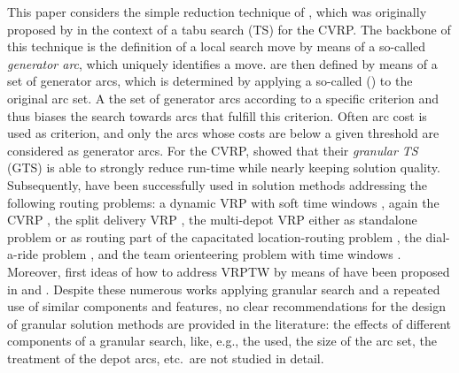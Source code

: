 \documentclass[11pt,a4paper,fleqn]{article}
\begin{document}
This paper considers the simple reduction technique of \gnIntro, which was originally proposed by \citet{toth:03} in the context of a tabu search (TS) for the CVRP. The backbone of this technique is the definition of a local search move by means of a so-called \emph{generator arc}, which uniquely identifies a move. \gnsL are then defined by means of a \reduced set of generator arcs, which is determined by applying a so-called \emph{\smlong} (\sm) to the original arc set. A \sm  \reduceS the set of generator arcs according to a specific criterion and thus biases the search towards arcs that fulfill this criterion. Often arc cost is used as criterion, and only the arcs whose costs are below a given threshold are considered as generator arcs. For the CVRP, \citet{toth:03} showed that their \emph{granular TS} (GTS) is able to strongly reduce run-time while nearly keeping solution quality. Subsequently, \gns have been successfully used in solution methods addressing the following routing problems: a dynamic VRP with soft time windows \citep{branchini:09}, again the CVRP \citep{jin:12}, the split delivery VRP \citep{berbotto:13}, the multi-depot VRP either as standalone problem \citep{escobar:14:mdvrp} or as routing part of the capacitated location-routing problem \citep{prins:07,escobar:13,escobar:14}, the dial-a-ride problem \citep[DARP, see][]{kirchler:13}, and the team orienteering problem with time windows \citep[TOPTW, see][]{labadie:12}. Moreover, first ideas of how to address VRPTW by means of \gns have been proposed in \citet{wc} and \citet{doppstadt:10}. Despite these numerous works applying granular search and a repeated use of similar components and features, no clear recommendations for the design of granular solution methods are provided in the literature:  the effects of different components of a granular search, like, e.g., the \smlong used, the size of the \reduced arc set, the treatment of the depot arcs, etc.~are not studied in detail.
\end{document}
